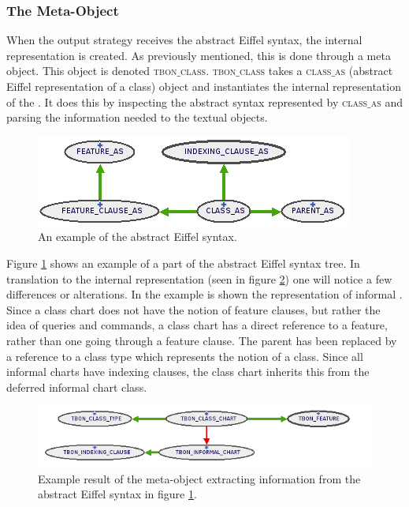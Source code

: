 \subsubsection{The Meta-Object}
\label{tbon_class}
When the output strategy receives the abstract Eiffel syntax, the internal \bon{} representation is created. As previously mentioned, this is done through a meta object. This object is denoted \textsc{tbon$\_$class}. \textsc{tbon$\_$class} takes a \textsc{class$\_$as} (abstract Eiffel representation of a class) object and instantiates the internal representation of the \bon{}. It does this by inspecting the abstract syntax represented by \textsc{class$\_$as} and parsing the information needed to the textual \bon{} objects.
\begin{figure}[H]
\centerline{
\includegraphics[scale=0.7]{images/abstract-syntax.png}
}
\caption{An example of the abstract Eiffel syntax.}
\label{fig:abstract-syntax}
\end{figure}

Figure \ref{fig:abstract-syntax} shows an example of a part of the abstract Eiffel syntax tree. In translation to the \bon{} internal representation (seen in figure \ref{fig:bon-rep}) one will notice a few differences or alterations. In the example is shown the representation of informal \bon. Since a class chart does not have the notion of feature clauses, but rather the idea of queries and commands, a class chart has a direct reference to a feature, rather than one going through a feature clause. The parent has been replaced by a reference to a class type which represents the notion of a class. Since all informal charts have indexing clauses, the class chart inherits this from the deferred informal chart class.
\begin{figure}[H]
\centerline{
\includegraphics[scale=0.7]{images/bon-representation.png}
}
\caption{Example result of the meta-object extracting information from the abstract Eiffel syntax in figure \ref{fig:abstract-syntax}.}
\label{fig:bon-rep}
\end{figure}